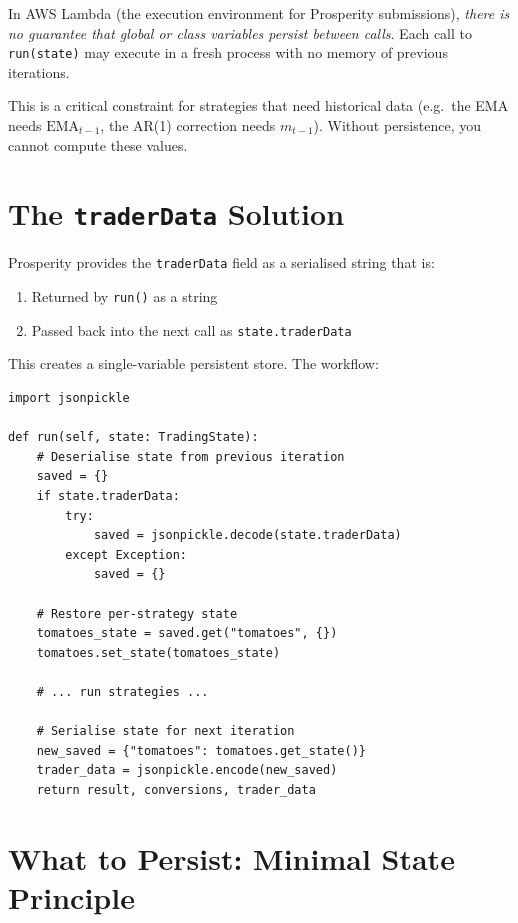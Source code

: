 \documentclass[12pt,a4paper,openany]{report}
\theoremstyle{definition}
\begin{document}
In AWS Lambda (the execution environment for Prosperity submissions), \emph{there is no guarantee that global or class variables persist between calls}. Each call to \texttt{run(state)} may execute in a fresh process with no memory of previous iterations.

This is a critical constraint for strategies that need historical data (e.g.\ the EMA needs $\text{EMA}_{t-1}$, the AR(1) correction needs $m_{t-1}$). Without persistence, you cannot compute these values.

\section{The \texttt{traderData} Solution}

Prosperity provides the \texttt{traderData} field as a serialised string that is:
\begin{enumerate}[label=\arabic*.]
  \item Returned by \texttt{run()} as a string
  \item Passed back into the next call as \texttt{state.traderData}
\end{enumerate}

This creates a single-variable persistent store. The workflow:

\begin{lstlisting}[caption={State serialisation pattern in Trader.run()}]
import jsonpickle

def run(self, state: TradingState):
    # Deserialise state from previous iteration
    saved = {}
    if state.traderData:
        try:
            saved = jsonpickle.decode(state.traderData)
        except Exception:
            saved = {}

    # Restore per-strategy state
    tomatoes_state = saved.get("tomatoes", {})
    tomatoes.set_state(tomatoes_state)

    # ... run strategies ...

    # Serialise state for next iteration
    new_saved = {"tomatoes": tomatoes.get_state()}
    trader_data = jsonpickle.encode(new_saved)
    return result, conversions, trader_data
\end{lstlisting}

\section{What to Persist: Minimal State Principle}
\end{document}
